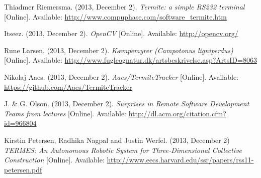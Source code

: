 \documentclass[oribibl]{llncs}
\begin{document}










\begin{thebibliography}{9}
    
		 Thiadmer Riemersma. (2013, December 2). \textit{Termite: a simple RS232 terminal} [Online]. Available: \url{http://www.compuphase.com/software_termite.htm}
        
         Itseez. (2013, December 2). \textit{OpenCV} [Online]. Available: \url{http://opencv.org/}
        
         Rune Larsen. (2013, December 2). \textit{Kæmpemyrer (Campotonus ligniperdus)} [Online]. Available: \url{http://www.fugleognatur.dk/artsbeskrivelse.asp?ArtsID=8063}
        
         Nikolaj Aaes. (2013, December 2). \textit{Aaes/TermiteTracker} [Online]. Available: \url{https://github.com/Aaes/TermiteTracker}
        
		 J. \& G. Olson. (2013, December 2). \textit{Surprises in Remote Software Development Teams from lectures} [Online]. Available: \url{http://dl.acm.org/citation.cfm?id=966804}
        
         Kirstin Petersen, Radhika Nagpal and Justin Werfel. (2013, December 2) \textit{TERMES: An Autonomous Robotic System for Three-Dimensional Collective Construction} [Online]. Available: \url{http://www.eecs.harvard.edu/ssr/papers/rss11-petersen.pdf}
        
\end{thebibliography}


\end{document}
